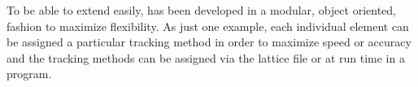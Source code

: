 To be able to extend \bmad easily, \bmad has been developed in a modular, object oriented, fashion
to maximize flexibility. As just one example, each individual element can be assigned a particular
tracking method in order to maximize speed or accuracy and the tracking methods can be assigned via
the lattice file or at run time in a program.

\vfill
\break
